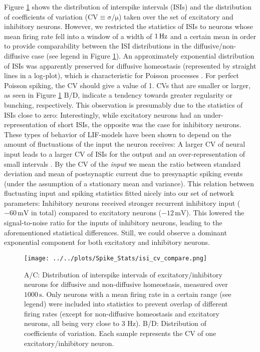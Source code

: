 \documentclass[10pt,a4paper]{article}
\begin{document}
Figure \ref{ISI_CV_compare} shows the distribution of interspike intervals (ISIs) and the distribution of coefficients of variation ($\mathrm{CV\equiv\sigma/\mu}$) taken over the set of excitatory and inhibitory neurons. However, we restricted the statistics of ISIs to neurons whose mean firing rate fell into a window of a width of $\rm 1\, Hz$ and a certain mean in order to provide comparability between the ISI distributions in the diffusive/non-diffusive case (see legend in Figure \ref{ISI_CV_compare}). An approximately exponential distribution of ISIs was apparently preserved for diffusive homeostasis (represented by straight lines in a log-plot), which is characteristic for Poisson processes \cite[p. 27]{Theor_Neur_Dayan}. For perfect Poisson spiking, the CV should give a value of 1. CVs that are smaller or larger, as seen in Figure \ref{ISI_CV_compare} B/D, indicate a tendency towards greater regularity or bunching, respectively. This observation is presumably due to the statistics of ISIs close to zero: Interestingly, while excitatory neurons had an  under-representation of short ISIs, the opposite was the case for inhibitory neurons. These types of behavior of LIF-models have been shown to depend on the amount of fluctuations of the input the neuron receives: A larger CV of neural input leads to a larger CV of ISIs for the output and an over-representation of small intervals \cite{Ostojic2011}. By the CV of the \emph{input} we mean the ratio between standard deviation and mean of postsynaptic current due to presynaptic spiking events (under the assumption of a stationary mean and variance). This relation between fluctuating input and spiking statistics fitted nicely into our set of network parameters: Inhibitory neurons received stronger recurrent inhibitory input ($\mathrm{-60\,mV}$ in total) compared to excitatory neurons ($\mathrm{-12\,mV}$). This lowered the signal-to-noise ratio for the inputs of inhibitory neurons, leading to the aforementioned statistical differences. Still, we could observe a dominant exponential component for both excitatory and inhibitory neurons.

\begin{figure}
\texttt{[image: ../../plots/Spike\_Stats/isi\_cv\_compare.png]}
\caption[Distribution of interspike intervals and of coefficients variation]{A/C: Distribution of interspike intervals of excitatory/inhibitory neurons for diffusive and non-diffusive homeostasis, measured over $\mathrm{1000\,s}$. Only neurons with a mean firing rate in a certain range (see legend) were included into statistics to prevent overlap of different firing rates (except for non-diffusive homeostasis and excitatory neurons, all being very close to 3 Hz). B/D: Distribution of coefficients of variation. Each sample represents the CV of one excitatory/inhibitory neuron.}
\label{ISI_CV_compare}
\end{figure}
\end{document}
